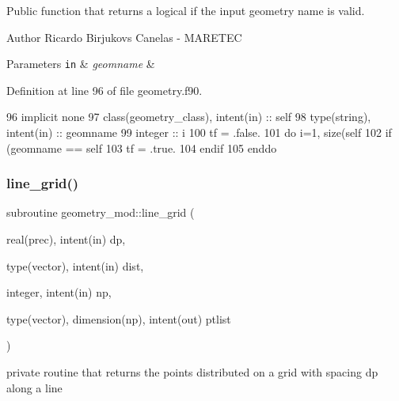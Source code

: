 Public function that returns a logical if the input geometry name is valid. 

\begin{DoxyAuthor}{Author}
Ricardo Birjukovs Canelas -\/ M\+A\+R\+E\+T\+EC
\end{DoxyAuthor}

\begin{DoxyParams}[1]{Parameters}
\mbox{\tt in}  & {\em geomname} & \\
\hline
\end{DoxyParams}


Definition at line 96 of file geometry.\+f90.


\begin{DoxyCode}
96     \textcolor{keywordtype}{implicit none}
97     \textcolor{keywordtype}{class}(geometry\_class), \textcolor{keywordtype}{intent(in)} :: self
98     \textcolor{keywordtype}{type}(string), \textcolor{keywordtype}{intent(in)} :: geomname
99     \textcolor{keywordtype}{integer} :: i
100     tf = .false.
101     \textcolor{keywordflow}{do} i=1, \textcolor{keyword}{size}(self%
102         \textcolor{keywordflow}{if} (geomname == self%
103             tf = .true.
104 \textcolor{keywordflow}{        endif}
105 \textcolor{keywordflow}{    enddo}
\end{DoxyCode}
\mbox{\label{namespacegeometry__mod_abcb09c0f5274c27cb79b0dd009ed94b3}} 
\subsubsection{\texorpdfstring{line\+\_\+grid()}{line\_grid()}}
{\footnotesize\ttfamily subroutine geometry\+\_\+mod\+::line\+\_\+grid (\begin{DoxyParamCaption}\item[{real(prec), intent(in)}]{dp,  }\item[{type(vector), intent(in)}]{dist,  }\item[{integer, intent(in)}]{np,  }\item[{type(vector), dimension(np), intent(out)}]{ptlist }\end{DoxyParamCaption})\hspace{0.3cm}{\ttfamily [private]}}



private routine that returns the points distributed on a grid with spacing dp along a line 

